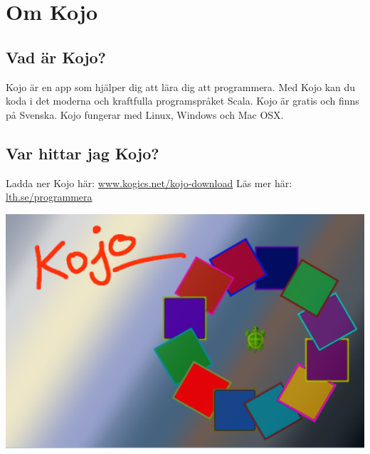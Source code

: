 \chapter{Om Kojo}
\begin{multicols}{2}
\section*{\color{black}Vad är Kojo?}
Kojo är en app som hjälper dig att lära dig att programmera. Med Kojo kan du koda i det moderna och kraftfulla programspråket Scala. Kojo är gratis och finns på Svenska. Kojo fungerar med Linux, Windows och Mac OSX.
\section*{\color{black}Var hittar jag Kojo?}
Ladda ner Kojo här: 
\href{http://www.kogics.net/kojo-download}{www.kogics.net/kojo-download}
Läs mer här: 
\href{http://lth.se/programmera}{lth.se/programmera}

\columnbreak

\includegraphics[width=14cm]{../img/kojo.png}
\end{multicols}

